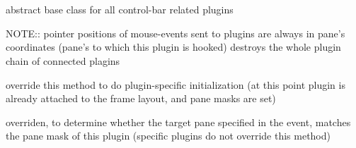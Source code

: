 %
%


\section{}\label{cbpluginbase}


abstract base class for all control-bar related plugins
 





\label{cbpluginbasecbpluginbase}





\label{cbpluginbasedtor}


NOTE:: pointer positions of mouse-events sent to plugins
are always in pane's coordinates (pane's to which
this plugin is hooked)
destroys the whole plugin chain of connected plagins


\label{cbpluginbasegetpanemask}



\label{cbpluginbaseisready}



\label{cbpluginbaseoninitplugin}


override this method to do plugin-specific initialization
(at this point plugin is already attached to the frame layout,
and pane masks are set)


\label{cbpluginbaseprocessevent}


overriden, to determine whether the target pane specified in the
event, matches the pane mask of this plugin (specific plugins
do not override this method)

